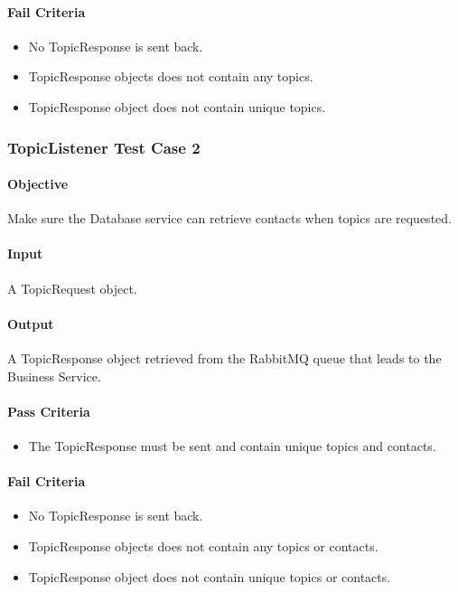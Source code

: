 \documentclass[hidelinks,english]{article}
\begin{document}
				\paragraph{Fail Criteria}
				\begin{itemize}
					\item No TopicResponse is sent back.
					\item TopicResponse objects does not contain any topics.
					\item TopicResponse object does not contain unique topics.
				\end{itemize}
				
			\subsubsection{TopicListener Test Case 2}\label{databasetopiclistenertest2}
				\paragraph{Objective} Make sure the Database service can retrieve contacts when topics are requested.
				\paragraph{Input} A TopicRequest object.
				\paragraph{Output} A TopicResponse object retrieved from the RabbitMQ queue that leads to the Business Service.
				\paragraph{Pass Criteria}
				\begin{itemize}
					\item The TopicResponse must be sent and contain unique topics and contacts.
				\end{itemize}
				\paragraph{Fail Criteria}
				\begin{itemize}
					\item No TopicResponse is sent back.
					\item TopicResponse objects does not contain any topics or contacts.
					\item TopicResponse object does not contain unique topics or contacts.
				\end{itemize}
				
\end{document}
